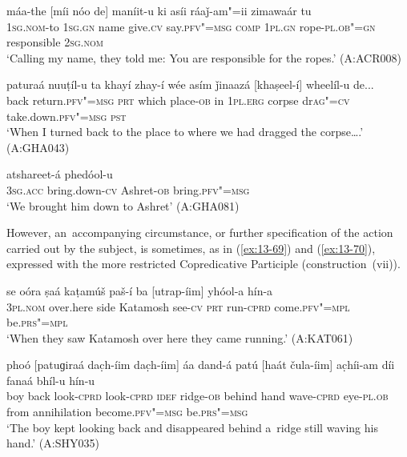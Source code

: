 \begin{exe}
\ex
\label{ex:13-66}
\gll máa-the [míi nóo de] maníit-u ki asíi ráaǰ-am"=ii zimawaár tu  \\
\textsc{1sg.nom}-to \textsc{1sg.gn} name give.\textsc{cv} say.\textsc{pfv"=msg} \textsc{comp}  \textsc{1pl.gn} rope-\textsc{pl.ob"=gn} responsible \textsc{2sg.nom}  \\
\glt `Calling my name, they told me: You are responsible for the ropes.' (A:ACR008)

\ex
\label{ex:13-67}
\gll paturaá nuuṭíl-u ta khayí zhay-í wée asím ǰinaazá [khaṣeel-í] wheelíl-u de... \\
back return.\textsc{pfv"=msg} \textsc{prt} which place-\textsc{ob} in \textsc{1pl.erg}  corpse dr\textsc{ag"=cv} take.down.\textsc{pfv"=msg} \textsc{pst} \\
\glt `When I turned back to the place to where we had dragged the corpse{\ldots}.' (A:GHA043)

\ex
\label{ex:13-68}
 atshareet-á phedóol-u \\
\textsc{3sg.acc} bring.down-\textsc{cv} Ashret-\textsc{ob} bring.\textsc{pfv"=msg} \\
\glt `We brought him down to Ashret' (A:GHA081) 
\end{exe}

However, an~accompanying circumstance, or further specification of the action carried out by the subject, is sometimes, as in (\ref{ex:13-69}) and (\ref{ex:13-70}), expressed with the more restricted Copredicative Participle (construction~(vii)).

\begin{exe}
\ex
\label{ex:13-69}
\gll se oóra ṣaá kaṭamúš paš-í ba [utrap-íim] yhóol-a hín-a \\
\textsc{3pl.nom} over.here side Katamosh see-\textsc{cv} \textsc{prt} run-\textsc{cprd} come.\textsc{pfv"=mpl} be.\textsc{prs"=mpl} \\
\glt `When they saw Katamosh over here they came running.' (A:KAT061)

\ex
\label{ex:13-70}
\gll phoó [patuɡiraá dac̣h-íim dac̣h-íim] áa dand-á patú [haát čula-íim] ac̣híi-am díi fanaá bhíl-u hín-u \\
boy back look-\textsc{cprd} look-\textsc{cprd} \textsc{idef}  ridge-\textsc{ob} behind hand wave-\textsc{cprd} eye-\textsc{pl.ob} from  annihilation become.\textsc{pfv"=msg} be.\textsc{prs"=msg} \\
\glt `The boy kept looking back and disappeared behind a~ridge still waving his hand.' (A:SHY035) 
\end{exe}

